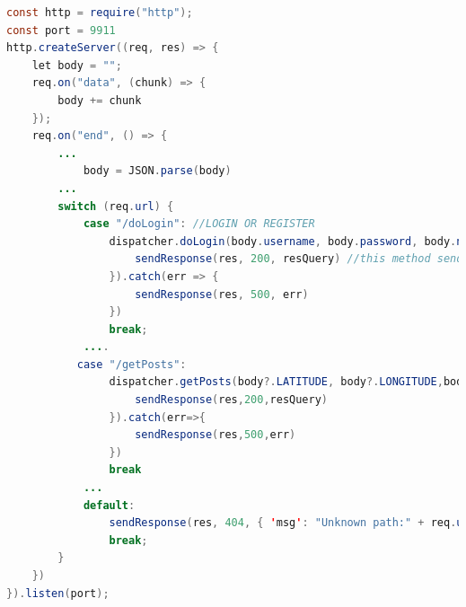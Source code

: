 \documentclass[conference]{IEEEtran}
\begin{document}
\begin{lstlisting}[language=Java, caption=Snippet of GeoMedia HTTP server]
const http = require("http");
const port = 9911
http.createServer((req, res) => {
    let body = "";
    req.on("data", (chunk) => {
        body += chunk
    });
    req.on("end", () => {
        ...
            body = JSON.parse(body)
        ...
        switch (req.url) {
            case "/doLogin": //LOGIN OR REGISTER
                dispatcher.doLogin(body.username, body.password, body.newuser).then(resQuery => {
                    sendResponse(res, 200, resQuery) //this method sends back the data
                }).catch(err => {
                    sendResponse(res, 500, err)
                })
                break;
            ....
           case "/getPosts":
                dispatcher.getPosts(body?.LATITUDE, body?.LONGITUDE,body?.USERNAME).then(resQuery=>{
                    sendResponse(res,200,resQuery)
                }).catch(err=>{
                    sendResponse(res,500,err)
                })
                break
            ...
            default:
                sendResponse(res, 404, { 'msg': "Unknown path:" + req.url })
                break;
        }
    })
}).listen(port);
\end{lstlisting}
\end{document}
